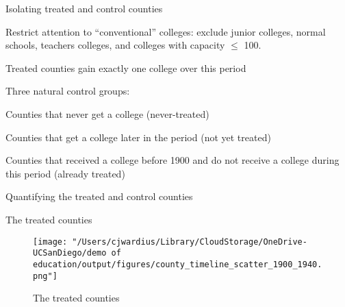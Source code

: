 \documentclass[notes,11pt, aspectratio=169]{beamer}
\newenvironment{wideitemize}{\itemize\addtolength{\itemsep}{10pt}}{\enditemize}
\begin{document}
\begin{frame}[label=isolating]{Isolating treated and control counties}
  \begin{wideitemize}
    \item Restrict attention to ``conventional'' colleges: exclude junior colleges, normal schools, teachers colleges, and colleges with capacity $\leq$ 100.
    \item Treated counties gain exactly one college over this period
    \item Three natural control groups:
    \begin{wideitemize}
      \item Counties that never get a college (never-treated)
      \item Counties that get a college later in the period (not yet treated)
      \item Counties that received a college before 1900 and do not receive a college during this period (already treated)
    \end{wideitemize}
  \end{wideitemize}

  \vspace{1em}
  \centering
  \hyperlink{spatialstability}{}
  \raggedright
  \hyperlink{countycrosswalk}{}
\end{frame}

\begin{frame}{Quantifying the treated and control counties}
  
\end{frame}


\begin{frame}{The treated counties}
   \begin{figure}
        \centering
        \texttt{[image: "/Users/cjwardius/Library/CloudStorage/OneDrive-UCSanDiego/demo of education/output/figures/county\_timeline\_scatter\_1900\_1940.png"]}
        \caption{The treated counties}
    \end{figure}
\end{frame}
\end{document}
